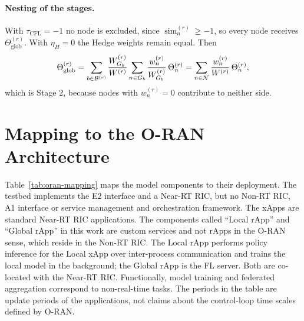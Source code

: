 \begin{EnChapter}
\paragraph{Nesting of the stages.}
With $\tau_{\mathrm{CFL}} = -1$ no node is excluded, since
$\operatorname{sim}_n^{(r)} \ge -1$, so every node receives
$\Theta_{\mathrm{glob}}^{(r)}$. With $\eta_H = 0$ the Hedge weights remain equal.
Then
\begin{equation}
  \Theta_{\mathrm{glob}}^{(r)} = \sum_{b \in \mathcal{B}^{(r)}} \frac{W_{G_b}^{(r)}}{W^{(r)}} \sum_{n \in G_b} \frac{w_n^{(r)}}{W_{G_b}^{(r)}}\, \Theta_n^{(r)} = \sum_{n \in \mathcal{N}} \frac{w_n^{(r)}}{W^{(r)}}\, \Theta_n^{(r)},
\end{equation}
which is Stage 2, because nodes with $w_n^{(r)} = 0$ contribute to neither side.

\section{Mapping to the O-RAN Architecture}
\label{subsec:oran}

Table~\ref{tab:oran-mapping} maps the model components to their deployment. The
testbed implements the E2 interface and a Near-RT RIC, but no Non-RT RIC, A1
interface or service management and orchestration framework. The xApps are
standard Near-RT RIC applications. The components called ``Local rApp'' and
``Global rApp'' in this work are custom services and not rApps in the O-RAN sense,
which reside in the Non-RT RIC. The Local rApp performs policy inference for the
Local xApp over inter-process communication and trains the local model in the
background; the Global rApp is the FL server. Both are co-located with the
Near-RT RIC. Functionally, model training and federated aggregation correspond to
non-real-time tasks. The periods in the table are update periods of the
applications, not claims about the control-loop time scales defined by O-RAN.


\end{EnChapter}
